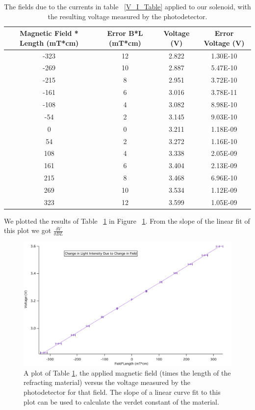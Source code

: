 \documentclass[prb,preprint]{revtex4-1}
\begin{document}
\begin{table}[h!]
\centering
\caption{The fields due to the currents in table ~\ref{V_I_Table} applied to our solenoid, with the resulting voltage measured by the photodetector. }
\begin{ruledtabular}
\begin{tabular}{c c c c}
Magnetic Field * Length (mT*cm) & Error B*L (mT*cm) & Voltage (V) & Error Voltage (V)\\
\hline	%
-323 & 12 & 2.822 & 1.30E-10 \\
-269 & 10 & 2.887 & 5.47E-10 \\
-215 & 8  & 2.951 & 3.72E-10 \\
-161 & 6  & 3.016 & 3.78E-11 \\
-108 & 4  & 3.082 & 8.98E-10 \\
-54  & 2  & 3.145 & 9.03E-10 \\
0    & 0  & 3.211 & 1.18E-09 \\
54   & 2  & 3.272 & 1.16E-10 \\
108  & 4  & 3.338 & 2.05E-09 \\
161  & 6  & 3.404 & 2.13E-09 \\
215  & 8  & 3.468 & 6.96E-10 \\
269  & 10 & 3.534 & 1.12E-09 \\
323  & 12 & 3.599 & 1.05E-09
\end{tabular}
\end{ruledtabular}
\label{V_B*L_Table}
\end{table}

We plotted the results of Table ~\ref{V_B*L_Table} in Figure ~\ref{V_B*L_Plot}. From the slope of the linear fit of this plot we got $\frac{\delta V}{\delta BL}$

\begin{figure}[h!]
\centering
\includegraphics[width=5in]{V_B-L_Plot.pdf}
\caption{A plot of Table \ref{V_B*L_Table}, the applied magnetic field (times the length of the refracting material) versus the voltage measured by the photodetector for that field. The slope of a linear curve fit to this plot can be used to calculate the verdet constant of the material. }
\label{V_B*L_Plot}
\end{figure}
\end{document}
